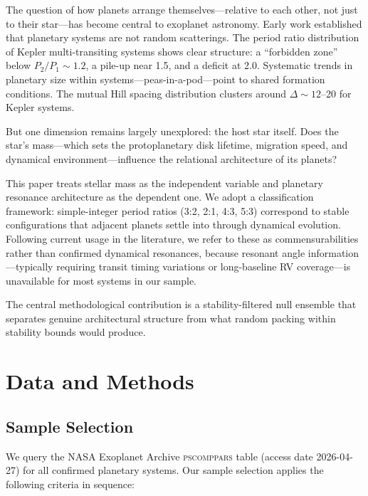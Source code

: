 \documentclass[twocolumn,usenatbib]{mnras}
\begin{document}
The question of how planets arrange themselves---relative to each other, not
just to their star---has become central to exoplanet astronomy. Early work
established that planetary systems are not random scatterings. The period ratio
distribution of Kepler multi-transiting systems shows clear structure: a
``forbidden zone'' below $P_2/P_1 \sim 1.2$, a pile-up near 1.5, and a deficit
at 2.0\citep{fabrycky2014,fang_margot_2012}. Systematic trends in planetary
size within systems---peas-in-a-pod---point to shared formation
conditions\citep{weiss2018,millholland2021}. The mutual Hill spacing
distribution clusters around $\Delta \sim 12$--20 for Kepler
systems\citep{puwu2015,fang_margot_2013}.

But one dimension remains largely unexplored: the host star itself. Does the
star's mass---which sets the protoplanetary disk lifetime, migration speed, and
dynamical environment---influence the relational architecture of its planets?

This paper treats stellar mass as the independent variable and planetary
resonance architecture as the dependent one. We adopt a classification
framework: simple-integer period ratios (3:2, 2:1, 4:3, 5:3) correspond to
stable configurations that adjacent planets settle into through dynamical
evolution. Following current usage in the literature\citep{mills2016,luger2017},
we refer to these as commensurabilities rather than confirmed dynamical
resonances, because resonant angle information---typically requiring transit
timing variations or long-baseline RV coverage---is unavailable for most systems
in our sample.

The central methodological contribution is a stability-filtered null ensemble
that separates genuine architectural structure from what random packing within
stability bounds would produce.

\section{Data and Methods}
\label{sec:methods}

\subsection{Sample Selection}
\label{sec:sample_selection}

We query the NASA Exoplanet Archive \textsc{pscomppars} table (access date
2026-04-27) for all confirmed planetary systems. Our sample selection applies
the following criteria in sequence:
\end{document}
